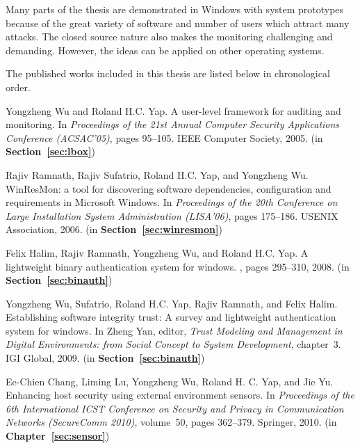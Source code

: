 Many parts of the thesis are demonstrated in Windows with system prototypes because of the great
variety of software and number of users which attract many attacks.
The closed source nature also makes the monitoring challenging and
demanding.
However, the ideas can be applied on other operating systems.

The published works included in this thesis are listed below in
chronological order.

\begin{tightenumerate}
\item
Yongzheng Wu and Roland H.C. Yap.
\newblock A user-level framework for auditing and monitoring.
\newblock In {\em Proceedings of the 21st Annual Computer Security Applications
  Conference (ACSAC'05)}, pages 95--105. IEEE Computer Society, 2005.
\newblock (in {\bf Section~\ref{sec:lbox}})

\item
Rajiv Ramnath, Rajiv Sufatrio, Roland H.C. Yap, and Yongzheng Wu.
\newblock WinResMon: a tool for discovering software dependencies,
  configuration and requirements in Microsoft Windows.
\newblock In {\em Proceedings of the 20th Conference on Large Installation
  System Administration (LISA'06)}, pages 175--186. USENIX Association, 2006.
\newblock (in {\bf Section~\ref{sec:winresmon}})

\item
Felix Halim, Rajiv Ramnath, Yongzheng Wu, and Roland H.C. Yap.
\newblock A lightweight binary authentication system for windows.
, pages 295--310, 2008.
\newblock (in {\bf Section~\ref{sec:binauth}})

\item
Yongzheng Wu, Sufatrio, Roland H.C. Yap, Rajiv Ramnath, and Felix Halim.
\newblock Establishing software integrity trust: A survey and lightweight
  authentication system for windows.
\newblock In Zheng Yan, editor, {\em Trust Modeling and Management in Digital
  Environments: from Social Concept to System Development}, chapter~3. IGI
  Global, 2009.
\newblock (in {\bf Section~\ref{sec:binauth}})

\item
Ee-Chien Chang, Liming Lu, Yongzheng Wu, Roland H. C. Yap, and Jie Yu.
\newblock Enhancing host security using external environment sensors.
\newblock In {\em Proceedings of the 6th International ICST Conference on
  Security and Privacy in Communication Networks (SecureComm 2010)}, volume~50,
  pages 362--379. Springer, 2010.
\newblock (in {\bf Chapter~\ref{sec:sensor}})


\end{tightenumerate}
